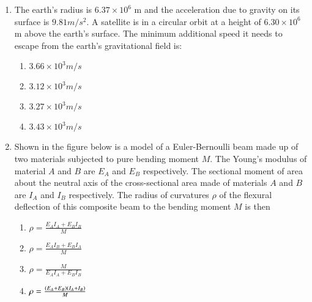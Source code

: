 \documentclass[journal]{IEEEtran}
\begin{document}
\begin{enumerate}
    \item The earth's radius is $6.37 \times 10^6$ m and the acceleration due to gravity on its surface
    is $9.81 m/s^2$. A satellite is in a circular orbit at a height of $6.30 \times 10^6$ m above the
    earth's surface. The minimum additional speed it needs to escape from the earth's gravitational field is:
    \begin{multicols}{2}
        \begin{enumerate}
            \item $3.66 \times 10^3 m/s$
            \item $3.12 \times 10^3 m/s$
            \item $3.27 \times 10^3 m/s$
            \item $3.43 \times 10^3 m/s$
        \end{enumerate}
    \end{multicols}

    \item Shown in the figure below is a model of a Euler-Bernoulli beam made up of two
    materials subjected to pure bending moment $M$. The Young's modulus of material $A$
    and $B$ are $E_A$ and $E_B$ respectively. The sectional moment of area about the neutral
    axis of the cross-sectional area made of materials $A$ and $B$ are $I_A$ and $I_B$
    respectively. The radius of curvatures $\rho$ of the flexural deflection of
    this composite beam to the bending moment $M$ is then

    
    \begin{multicols}{4}
        \begin{enumerate}
            \item $\rho = \frac{E_AI_A + E_BI_B}{M}$
            \item $\rho = \frac{E_AI_B + E_BI_A}{M}$
            \item $\rho = \frac{M}{E_AI_A + E_BI_B}$
            \item $\rho = \frac{\left(E_A + E_B\right)\left(I_A + I_B\right)}{M}$
        \end{enumerate}
    \end{multicols}


\end{enumerate}
\end{document}
